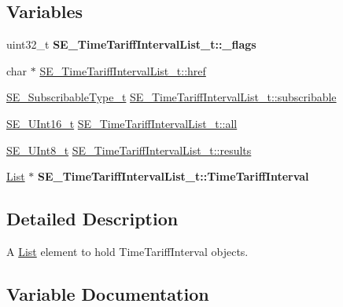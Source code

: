 \subsection*{Variables}
\begin{DoxyCompactItemize}
\item 
\mbox{\label{group__TimeTariffIntervalList_ga54947bfd6092972d090cca044245a1c4}} 
uint32\+\_\+t {\bfseries S\+E\+\_\+\+Time\+Tariff\+Interval\+List\+\_\+t\+::\+\_\+flags}
\item 
char $\ast$ \hyperlink{group__TimeTariffIntervalList_ga371ed4352ff21e9f24d404ff0e9f81b6}{S\+E\+\_\+\+Time\+Tariff\+Interval\+List\+\_\+t\+::href}
\item 
\hyperlink{group__SubscribableType_ga5c41f553d369710ed34619266bf2551e}{S\+E\+\_\+\+Subscribable\+Type\+\_\+t} \hyperlink{group__TimeTariffIntervalList_ga1a55fc782a58ffbef307e3bae8f43f6c}{S\+E\+\_\+\+Time\+Tariff\+Interval\+List\+\_\+t\+::subscribable}
\item 
\hyperlink{group__UInt16_gac68d541f189538bfd30cfaa712d20d29}{S\+E\+\_\+\+U\+Int16\+\_\+t} \hyperlink{group__TimeTariffIntervalList_gaa1a9b18d3c16c9c03f73ec471c048898}{S\+E\+\_\+\+Time\+Tariff\+Interval\+List\+\_\+t\+::all}
\item 
\hyperlink{group__UInt8_gaf7c365a1acfe204e3a67c16ed44572f5}{S\+E\+\_\+\+U\+Int8\+\_\+t} \hyperlink{group__TimeTariffIntervalList_ga46a856a44a08a8467dc3927024765e11}{S\+E\+\_\+\+Time\+Tariff\+Interval\+List\+\_\+t\+::results}
\item 
\mbox{\label{group__TimeTariffIntervalList_gac8320a127173387e29d433e3bdf680f8}} 
\hyperlink{structList}{List} $\ast$ {\bfseries S\+E\+\_\+\+Time\+Tariff\+Interval\+List\+\_\+t\+::\+Time\+Tariff\+Interval}
\end{DoxyCompactItemize}


\subsection{Detailed Description}
A \hyperlink{structList}{List} element to hold Time\+Tariff\+Interval objects. 

\subsection{Variable Documentation}
\mbox{\label{group__TimeTariffIntervalList_gaa1a9b18d3c16c9c03f73ec471c048898}} 
